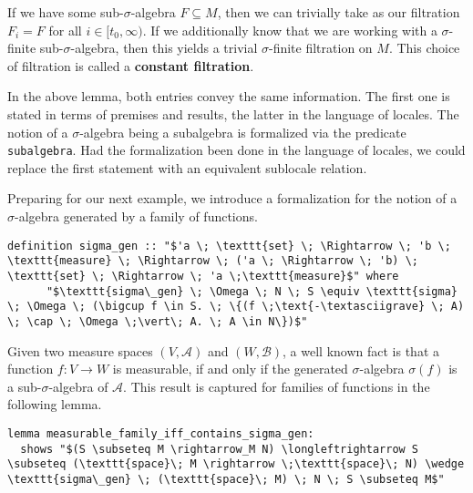 If we have some sub-$\sigma$-algebra $F \subseteq M$, then we can trivially take as our filtration $F_i = F$ for all $i \in [t_0,\infty)$. If we additionally know that we are working with a $\sigma$-finite sub-$\sigma$-algebra, then this yields a trivial $\sigma$-finite filtration on $M$. This choice of filtration is called a \textbf{constant filtration}. 

\begin{remark}
	In the above lemma, both entries convey the same information. The first one is stated in terms of premises and results, the latter in the language of locales. The notion of a $\sigma$-algebra being a subalgebra is formalized via the predicate \texttt{subalgebra}. Had the formalization been done in the language of locales, we could replace the first statement with an equivalent sublocale relation.
\end{remark}

Preparing for our next example, we introduce a formalization for the notion of a $\sigma$-algebra generated by a family of functions.

\begin{isadefinition}
{\small
\begin{lstlisting}[style=isabelle]
	definition sigma_gen :: "$'a \; \texttt{set} \; \Rightarrow \; 'b \; \texttt{measure} \; \Rightarrow \; ('a \; \Rightarrow \; 'b) \; \texttt{set} \; \Rightarrow \; 'a \;\texttt{measure}$" where
	  "$\texttt{sigma\_gen} \; \Omega \; N \; S \equiv \texttt{sigma} \; \Omega \; (\bigcup f \in S. \; \{(f \;\text{-\textasciigrave} \; A) \; \cap \; \Omega \;\vert\; A. \; A \in N\})$"
  \end{lstlisting}
}
\end{isadefinition}

Given two measure spaces $(V, \mathcal{A})$ and $(W, \mathcal{B})$, a well known fact is that a function $f : V \rightarrow W$ is measurable, if and only if the generated $\sigma$-algebra $\sigma(f)$ is a sub-$\sigma$-algebra of $\mathcal{A}$. This result is captured for families of functions in the following lemma.

\begin{isalemma}
{\small
\begin{lstlisting}[style=isabelle]
lemma measurable_family_iff_contains_sigma_gen:
  shows "$(S \subseteq M \rightarrow_M N) \longleftrightarrow S \subseteq (\texttt{space}\; M \rightarrow \;\texttt{space}\; N) \wedge \texttt{sigma\_gen} \; (\texttt{space}\; M) \; N \; S \subseteq M$"
\end{lstlisting}
}
\end{isalemma}

